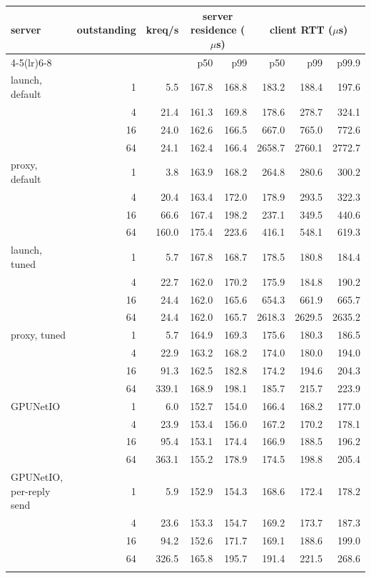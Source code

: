 \begin{tabular}{lrrrrrrr}\toprule
server & outstanding & kreq/s & \multicolumn{2}{c}{server residence ($\mu$s)} & \multicolumn{3}{c}{client RTT ($\mu$s)} \\
\cmidrule(lr){4-5}\cmidrule(lr){6-8}
 & & & p50 & p99 & p50 & p99 & p99.9 \\ \midrule
launch, default & 1 & 5.5 & 167.8 & 168.8 & 183.2 & 188.4 & 197.6 \\
 & 4 & 21.4 & 161.3 & 169.8 & 178.6 & 278.7 & 324.1 \\
 & 16 & 24.0 & 162.6 & 166.5 & 667.0 & 765.0 & 772.6 \\
 & 64 & 24.1 & 162.4 & 166.4 & 2658.7 & 2760.1 & 2772.7 \\
\addlinespace
proxy, default & 1 & 3.8 & 163.9 & 168.2 & 264.8 & 280.6 & 300.2 \\
 & 4 & 20.4 & 163.4 & 172.0 & 178.9 & 293.5 & 322.3 \\
 & 16 & 66.6 & 167.4 & 198.2 & 237.1 & 349.5 & 440.6 \\
 & 64 & 160.0 & 175.4 & 223.6 & 416.1 & 548.1 & 619.3 \\
\addlinespace
launch, tuned & 1 & 5.7 & 167.8 & 168.7 & 178.5 & 180.8 & 184.4 \\
 & 4 & 22.7 & 162.0 & 170.2 & 175.9 & 184.8 & 190.2 \\
 & 16 & 24.4 & 162.0 & 165.6 & 654.3 & 661.9 & 665.7 \\
 & 64 & 24.4 & 162.0 & 165.7 & 2618.3 & 2629.5 & 2635.2 \\
\addlinespace
proxy, tuned & 1 & 5.7 & 164.9 & 169.3 & 175.6 & 180.3 & 186.5 \\
 & 4 & 22.9 & 163.2 & 168.2 & 174.0 & 180.0 & 194.0 \\
 & 16 & 91.3 & 162.5 & 182.8 & 174.2 & 194.6 & 204.3 \\
 & 64 & 339.1 & 168.9 & 198.1 & 185.7 & 215.7 & 223.9 \\
\addlinespace
GPUNetIO & 1 & 6.0 & 152.7 & 154.0 & 166.4 & 168.2 & 177.0 \\
 & 4 & 23.9 & 153.4 & 156.0 & 167.2 & 170.2 & 178.1 \\
 & 16 & 95.4 & 153.1 & 174.4 & 166.9 & 188.5 & 196.2 \\
 & 64 & 363.1 & 155.2 & 178.9 & 174.5 & 198.8 & 205.4 \\
\addlinespace
GPUNetIO, per-reply send & 1 & 5.9 & 152.9 & 154.3 & 168.6 & 172.4 & 178.2 \\
 & 4 & 23.6 & 153.3 & 154.7 & 169.2 & 173.7 & 187.3 \\
 & 16 & 94.2 & 152.6 & 171.7 & 169.1 & 188.6 & 199.0 \\
 & 64 & 326.5 & 165.8 & 195.7 & 191.4 & 221.5 & 268.6 \\
\addlinespace
\bottomrule\end{tabular}
